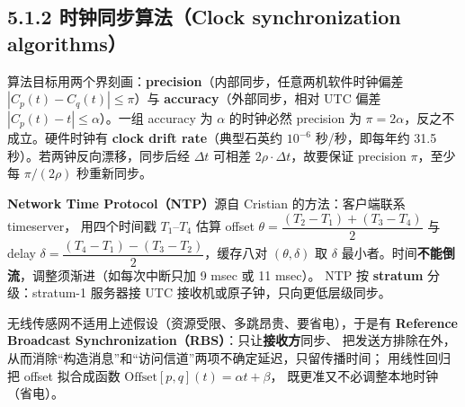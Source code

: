 \subsection*{5.1.2 时钟同步算法（Clock synchronization algorithms）}

算法目标用两个界刻画：\textbf{precision}（内部同步，任意两机软件时钟偏差
$|C_p(t)-C_q(t)| \le \pi$）与 \textbf{accuracy}（外部同步，相对 UTC 偏差
$|C_p(t)-t| \le \alpha$）。一组 accuracy 为 $\alpha$ 的时钟必然 precision 为
$\pi = 2\alpha$，反之不成立。硬件时钟有 \textbf{clock drift rate}（典型石英约
$10^{-6}$ 秒/秒，即每年约 31.5 秒）。若两钟反向漂移，同步后经 $\Delta t$ 可相差
$2\rho\cdot\Delta t$，故要保证 precision $\pi$，至少每 $\pi/(2\rho)$ 秒重新同步。

\textbf{Network Time Protocol（NTP）}源自 Cristian 的方法：客户端联系 timeserver，
用四个时间戳 $T_1$–$T_4$ 估算 offset
$\theta = \dfrac{(T_2-T_1)+(T_3-T_4)}{2}$ 与 delay
$\delta = \dfrac{(T_4-T_1)-(T_3-T_2)}{2}$，缓存八对 $( \theta, \delta )$ 取
$\delta$ 最小者。时间\textbf{不能倒流}，调整须渐进（如每次中断只加 9 msec 或 11 msec）。
NTP 按 \textbf{stratum} 分级：stratum-1 服务器接 UTC 接收机或原子钟，只向更低层级同步。

无线传感网不适用上述假设（资源受限、多跳昂贵、要省电），于是有
\textbf{Reference Broadcast Synchronization（RBS）}：只让\textbf{接收方}同步、
把发送方排除在外，从而消除“构造消息”和“访问信道”两项不确定延迟，只留传播时间；
用线性回归把 offset 拟合成函数 $\mathrm{Offset}[p,q](t) = \alpha t + \beta$，
既更准又不必调整本地时钟（省电）。

\begin{closeread}
\end{closeread}

\begin{closeread}
\end{closeread}

